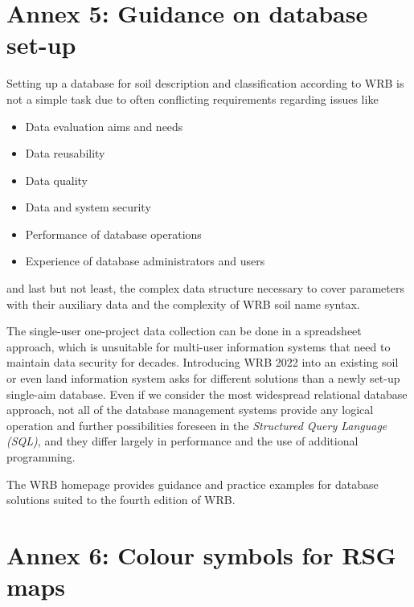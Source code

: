 \documentclass[
  letterpaper,
  DIV=11,
  numbers=noendperiod]{scrreprt}
\providecommand{\tightlist}{%
  \setlength{\itemsep}{0pt}\setlength{\parskip}{0pt}}\usepackage{longtable,booktabs,array}
\begin{document}

\hypertarget{annex-5-guidance-on-database-set-up}{%
\chapter{Annex 5: Guidance on database
set-up}\label{annex-5-guidance-on-database-set-up}}

Setting up a database for soil description and classification according
to WRB is not a simple task due to often conflicting requirements
regarding issues like

\begin{itemize}
\tightlist
\item
  Data evaluation aims and needs
\item
  Data reusability
\item
  Data quality
\item
  Data and system security
\item
  Performance of database operations
\item
  Experience of database administrators and users
\end{itemize}

and last but not least, the complex data structure necessary to cover
parameters with their auxiliary data and the complexity of WRB soil name
syntax.

The single-user one-project data collection can be done in a spreadsheet
approach, which is unsuitable for multi-user information systems that
need to maintain data security for decades. Introducing WRB 2022 into an
existing soil or even land information system asks for different
solutions than a newly set-up single-aim database. Even if we consider
the most widespread relational database approach, not all of the
database management systems provide any logical operation and further
possibilities foreseen in the \emph{Structured Query Language (SQL)},
and they differ largely in performance and the use of additional
programming.

The WRB homepage provides guidance and practice examples for database
solutions suited to the fourth edition of WRB.


\hypertarget{annex-6-colour-symbols-for-rsg-maps}{%
\chapter{Annex 6: Colour symbols for RSG
maps}\label{annex-6-colour-symbols-for-rsg-maps}}
\end{document}
